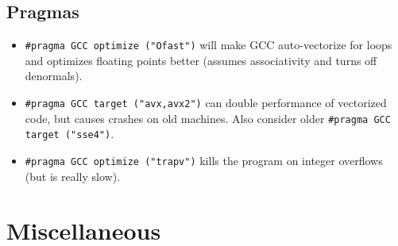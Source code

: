 	\subsection{Pragmas}
		\begin{itemize}
			\item \lstinline{#pragma GCC optimize ("Ofast")} will make GCC auto-vectorize for loops and optimizes floating points better (assumes associativity and turns off denormals).
			\item \lstinline{#pragma GCC target ("avx,avx2")} can double performance of vectorized code, but causes crashes on old machines. Also consider older \lstinline{#pragma GCC target ("sse4")}.
			\item \lstinline{#pragma GCC optimize ("trapv")} kills the program on integer overflows (but is really slow).
		\end{itemize}



\section{Miscellaneous}
